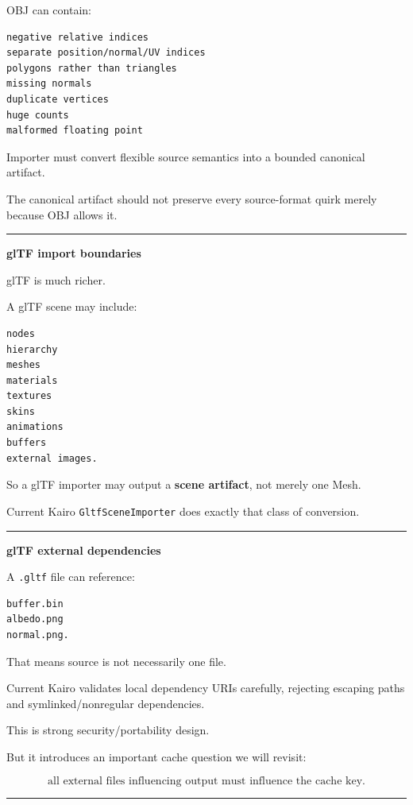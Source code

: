 OBJ can contain:

\begin{verbatim}
negative relative indices
separate position/normal/UV indices
polygons rather than triangles
missing normals
duplicate vertices
huge counts
malformed floating point
\end{verbatim}

Importer must convert flexible source semantics into a bounded canonical artifact.

The canonical artifact should not preserve every source-format quirk merely because OBJ allows it.

\begin{center}\rule{0.5\linewidth}{0.5pt}\end{center}

\textbf{glTF import boundaries}

glTF is much richer.

A glTF scene may include:

\begin{verbatim}
nodes
hierarchy
meshes
materials
textures
skins
animations
buffers
external images.
\end{verbatim}

So a glTF importer may output a \textbf{scene artifact}, not merely one Mesh.

Current Kairo \texttt{GltfSceneImporter} does exactly that class of conversion.

\begin{center}\rule{0.5\linewidth}{0.5pt}\end{center}

\textbf{glTF external dependencies}

A \texttt{.gltf} file can reference:

\begin{verbatim}
buffer.bin
albedo.png
normal.png.
\end{verbatim}

That means source is not necessarily one file.

Current Kairo validates local dependency URIs carefully, rejecting escaping paths and symlinked/nonregular dependencies.

This is strong security/portability design.

But it introduces an important cache question we will revisit:

\[
\boxed{
\text{all external files influencing output must influence the cache key}.
}
\]

\begin{center}\rule{0.5\linewidth}{0.5pt}\end{center}

